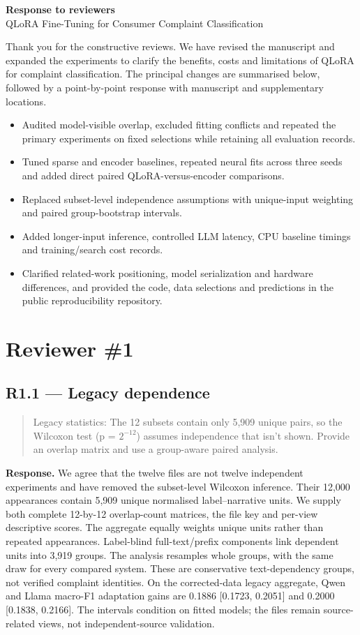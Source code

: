 \documentclass[11pt,a4paper]{article}
\begin{document}
\begin{center}{\Large\bfseries Response to reviewers}\\[5pt]QLoRA Fine-Tuning for Consumer Complaint Classification\end{center}

Thank you for the constructive reviews. We have revised the manuscript and expanded the experiments to clarify the benefits, costs and limitations of QLoRA for complaint classification. The principal changes are summarised below, followed by a point-by-point response with manuscript and supplementary locations.
\begin{itemize}
\item Audited model-visible overlap, excluded fitting conflicts and repeated the primary experiments on fixed selections while retaining all evaluation records.
\item Tuned sparse and encoder baselines, repeated neural fits across three seeds and added direct paired QLoRA-versus-encoder comparisons.
\item Replaced subset-level independence assumptions with unique-input weighting and paired group-bootstrap intervals.
\item Added longer-input inference, controlled LLM latency, CPU baseline timings and training/search cost records.
\item Clarified related-work positioning, model serialization and hardware differences, and provided the code, data selections and predictions in the public reproducibility repository.
\end{itemize}

\section*{Reviewer \#1}

\subsection*{R1.1 — Legacy dependence}
\begin{quote}\small Legacy statistics: The 12 subsets contain only 5,909 unique pairs, so the Wilcoxon test (p = \(2^{-12}\)) assumes independence that isn’t shown. Provide an overlap matrix and use a group-aware paired analysis.\end{quote}
\textbf{Response.} We agree that the twelve files are not twelve independent experiments and have removed the subset-level Wilcoxon inference. Their 12,000 appearances contain 5,909 unique normalised label–narrative units. We supply both complete 12-by-12 overlap-count matrices, the file key and per-view descriptive scores. The aggregate equally weights unique units rather than repeated appearances. Label-blind full-text/prefix components link dependent units into 3,919 groups. The analysis resamples whole groups, with the same draw for every compared system. These are conservative text-dependency groups, not verified complaint identities. On the corrected-data legacy aggregate, Qwen and Llama macro-F1 adaptation gains are 0.1886 [0.1723, 0.2051] and 0.2000 [0.1838, 0.2166]. The intervals condition on fitted models; the files remain source-related views, not independent-source validation.
\end{document}
